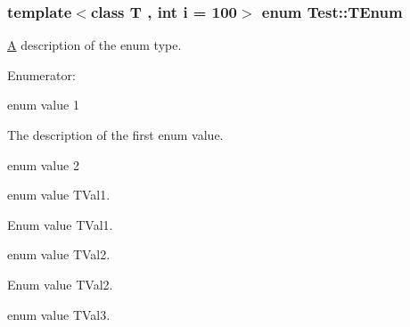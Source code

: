 \hypertarget{class_test_ad8d13fe56b896633273087859b89a1a3}{
\subsubsection[{T\-Enum}]{\setlength{\rightskip}{0pt plus 5cm}template$<$class T , int i = 100$>$ enum {\bf Test\-::\-T\-Enum}}}\label{class_test_ad8d13fe56b896633273087859b89a1a3}
\hyperlink{class_a}{A} description of the enum type. \begin{Desc}
\item[Enumerator\-: ]\par
\begin{description}
\item[{\em 
\hypertarget{class_test_ad8d13fe56b896633273087859b89a1a3af621232782128e49458adf9069e126d4}{Val1}\label{class_test_ad8d13fe56b896633273087859b89a1a3af621232782128e49458adf9069e126d4}
}]enum value 1

The description of the first enum value. \item[{\em 
\hypertarget{class_test_ad8d13fe56b896633273087859b89a1a3a218603a97012ef8dce0b798d598b2866}{Val2}\label{class_test_ad8d13fe56b896633273087859b89a1a3a218603a97012ef8dce0b798d598b2866}
}]enum value 2 \item[{\em 
\hypertarget{class_test_ad8d13fe56b896633273087859b89a1a3a6db45e8c0b1d4e96e688fd43d343907a}{T\-Val1}\label{class_test_ad8d13fe56b896633273087859b89a1a3a6db45e8c0b1d4e96e688fd43d343907a}
}]enum value T\-Val1.

Enum value T\-Val1. \item[{\em 
\hypertarget{class_test_ad8d13fe56b896633273087859b89a1a3a13b0433f996716c25158cecf9ee545c4}{T\-Val2}\label{class_test_ad8d13fe56b896633273087859b89a1a3a13b0433f996716c25158cecf9ee545c4}
}]enum value T\-Val2.

Enum value T\-Val2. \item[{\em 
\hypertarget{class_test_ad8d13fe56b896633273087859b89a1a3a5642b0033d6d17c4c9bee72133059f26}{T\-Val3}\label{class_test_ad8d13fe56b896633273087859b89a1a3a5642b0033d6d17c4c9bee72133059f26}
}]enum value T\-Val3.


\end{description}
\end{Desc}

